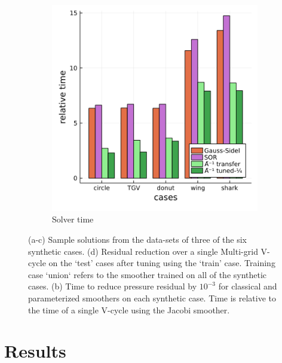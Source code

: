 \documentclass[review]{elsarticle}
\begin{document}
\begin{figure}
\begin{subfigure}[b]{0.47\textwidth}
        \includegraphics[width=\textwidth]{figures/crosscount.png}
        \caption{Solver time}
        \label{fig:synthetic time}
    \end{subfigure}
    \caption{(a-c) Sample solutions from the data-sets of three of the six synthetic cases. (d) Residual reduction over a single Multi-grid V-cycle on the `test' cases after tuning using the `train' case. Training case `union` refers to the smoother trained on all of the synthetic cases. (b) Time to reduce pressure residual by $10^{-3}$ for classical and parameterized smoothers on each synthetic case. Time is relative to the time of a single V-cycle using the Jacobi smoother.}
    \label{fig:synthetic cases}
\end{figure}



\section{Results}
\end{document}
